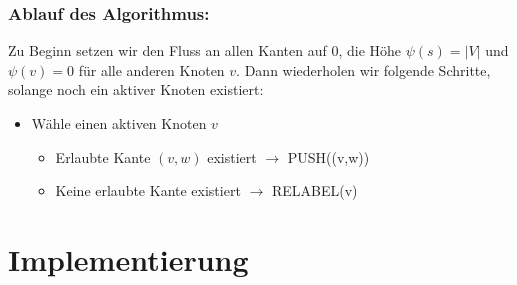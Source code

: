 \documentclass{llncs}
\begin{document}
\subsubsection{Ablauf des Algorithmus: }
Zu Beginn setzen wir den Fluss an allen Kanten auf 0, die Höhe $\psi(s)=|V|$ und $\psi(v)=0$ für alle anderen Knoten $v$.
Dann wiederholen wir folgende Schritte, solange noch ein aktiver Knoten existiert:

\begin{itemize}
\item Wähle einen aktiven Knoten $v$
\begin{itemize}
\item Erlaubte Kante $(v,w)$ existiert $\rightarrow$ PUSH((v,w))
\item Keine erlaubte Kante existiert $\rightarrow$ RELABEL(v)
\end{itemize}
\end{itemize}

\section{Implementierung}\label{Implementierung}
\end{document}
